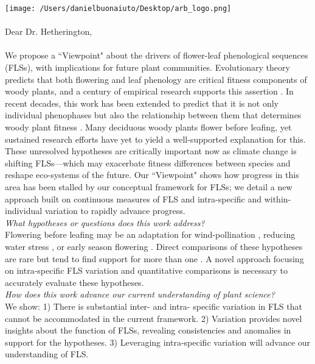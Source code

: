 \documentclass[11pt,a4paper]{article}
\begin{document}

\def\labelitemi{--}
\parindent=24pt
\texttt{[image: /Users/danielbuonaiuto/Desktop/arb\_logo.png]}
\\\\
{Dear Dr. Hetherington,}\\
\vspace{1.5ex}\\
\noindent We propose a ``Viewpoint" about the drivers of flower-leaf phenological sequences (FLSs), with implications for future plant communities. Evolutionary theory predicts that both flowering and leaf phenology are critical fitness components of woody plants, and a century of empirical research supports this assertion \citep{Munguia-Rosas2011,Forrest2010}. In recent decades, this work has been extended to predict that it is not only individual phenophases but also the relationship between them that determines woody plant fitness \citep{Menzel1999,Ettinger2018}. Many deciduous woody plants flower before leafing, yet sustained research efforts have yet to yield a well-supported explanation for this. These unresolved hypotheses are critically important now as climate change is shifting FLSs---which may exacerbate fitness differences between species and reshape eco-systems of the future. Our ``Viewpoint" shows how progress in this area has been stalled by our conceptual framework for FLSs; we detail a new approach built on continuous measures of FLS and intra-specific and within-individual variation to rapidly advance progress.\\

\noindent \emph{What hypotheses or questions does this work address?}\\

\noindent Flowering before leafing may be an adaptation for wind-pollination \citep{Rathcke_1985}, reducing water stress \citep{Reich1984}, or early season flowering \citep{Primack1987}. Direct comparisons of these hypotheses are rare but tend to find support for more than one \citep{Gougherty2018,Bolmgren2003}. A novel approach focusing on intra-specific FLS variation and quantitative comparisons is necessary to accurately evaluate these hypotheses.\\

\noindent \emph{How does this work advance our current understanding of plant science?}\\

\noindent We show: 1) There is substantial inter- and intra- specific variation in FLS that cannot be accommodated in the current framework. 2) Variation provides novel insights about the function of FLSs, revealing consistencies and anomalies in support for the hypotheses. 3) Leveraging intra-specific variation will advance our understanding of FLS.\\
\end{document}
